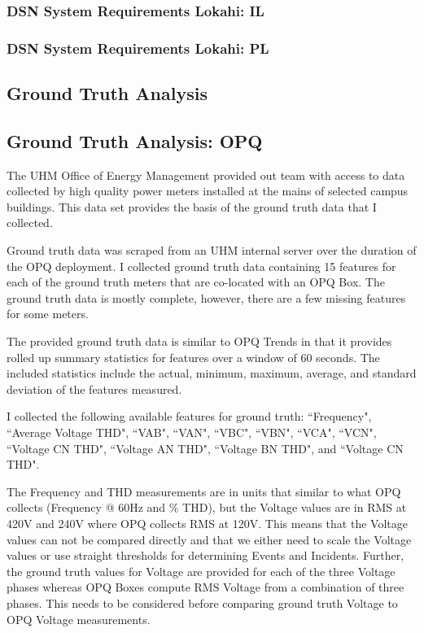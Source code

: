 \subsubsection{DSN System Requirements Lokahi: IL}

\subsubsection{DSN System Requirements Lokahi: PL}

\subsection{Ground Truth Analysis}

\subsection{Ground Truth Analysis: OPQ}

The UHM Office of Energy Management provided out team with access to data collected by high quality power meters installed at the mains of selected campus buildings. This data set provides the basis of the ground truth data that I collected.

Ground truth data was scraped from an UHM internal server over the duration of the OPQ deployment. I collected ground truth data containing 15 features for each of the ground truth meters that are co-located with an OPQ Box. The ground truth data is mostly complete, however, there are a few missing features for some meters.

The provided ground truth data is similar to OPQ Trends in that it provides rolled up summary statistics for features over a window of 60 seconds. The included statistics include the actual, minimum, maximum, average, and standard deviation of the features measured.

I collected the following available features for ground truth: ``Frequency", ``Average Voltage THD", ``VAB", ``VAN", ``VBC", ``VBN", ``VCA", ``VCN", ``Voltage CN THD", ``Voltage AN THD", ``Voltage BN THD", and ``Voltage CN THD".

The Frequency and THD measurements are in units that similar to what OPQ collects (Frequency @ 60Hz and \% THD), but the Voltage values are in RMS at 420V and 240V where OPQ collects RMS at 120V. This means that the Voltage values can not be compared directly and that we either need to scale the Voltage values or use straight thresholds for determining Events and Incidents. Further, the ground truth values for Voltage are provided for each of the three Voltage phases whereas OPQ Boxes compute RMS Voltage from a combination of three phases. This needs to be considered before comparing ground truth Voltage to OPQ Voltage measurements.

